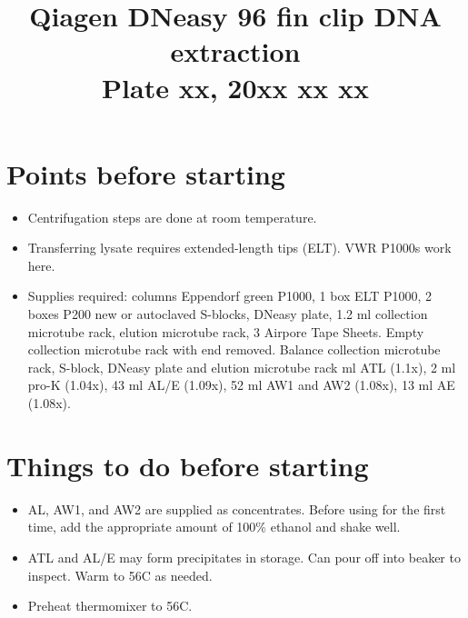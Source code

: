 \documentclass{article}
\title{Qiagen DNeasy 96 fin clip DNA extraction \\ Plate xx, 20xx xx xx}
\author{}
\date{}
\begin{document}
\maketitle

\section*{Points before starting}
\begin{itemize}
    \item Centrifugation steps are done at room temperature.
    \item Transferring lysate requires extended-length tips (ELT). VWR P1000s work here.
    \item Supplies required:
     columns Eppendorf green P1000, 1 box ELT P1000, 2 boxes P200
     new or autoclaved S-blocks, DNeasy plate, 1.2 ml collection microtube rack, elution microtube rack, 3 Airpore Tape Sheets. 
    \subitem Empty collection microtube rack with end removed. 
    \subitem Balance collection microtube rack, S-block, DNeasy plate and elution microtube rack
     ml ATL (1.1x), 2 ml pro-K (1.04x), 43 ml AL/E (1.09x), 52 ml AW1 and AW2 (1.08x), 13 ml AE (1.08x).
\end{itemize}

\section*{Things to do before starting}
\begin{itemize}
    \item AL, AW1, and AW2 are supplied as concentrates. Before using for the first time, add the appropriate amount of 100\% ethanol and shake well.
    \item ATL and AL/E may form precipitates in storage. Can pour off into beaker to inspect. Warm to 56C as needed.
    \item Preheat thermomixer to 56C.
\end{itemize}
\end{document}
